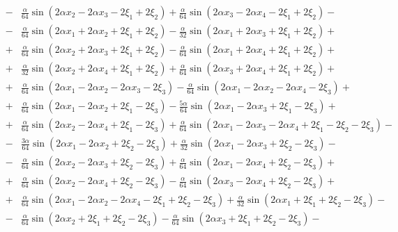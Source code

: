 \documentclass[11pt]{jfm}
\numberwithin{equation}{section}
\begin{document}
\begin{eqnarray}
&\!-\!& \frac{\alpha}{64} \sin(2\alpha x_2 \!-\! 2\alpha x_3 \!-\! 2\xi_1 \!+\! 2\xi_2)\!+\! \frac{\alpha}{64} \sin(2\alpha x_3 \!-\! 2\alpha x_4 \!-\! 2\xi_1 \!+\! 2\xi_2)\!-\!\nonumber\\
&\!-\! &\frac{\alpha}{64} \sin(2\alpha x_1 \!+\! 2\alpha x_2 \!+\! 2\xi_1 \!+\! 2\xi_2) \!-\! \frac{\alpha}{32} \sin(2\alpha x_1 \!+\! 2\alpha x_3 \!+\! 2\xi_1 \!+\! 2\xi_2)\!+\!\nonumber\\
&\!+\!&\frac{\alpha}{64} \sin(2\alpha x_2 \!+\! 2\alpha x_3 \!+\! 2\xi_1 \!+\! 2\xi_2)\!-\! \frac{\alpha}{64} \sin(2\alpha x_1 \!+\! 2\alpha x_4 \!+\! 2\xi_1 \!+\! 2\xi_2)\!+\! \nonumber\\
&\!+\!& \frac{\alpha}{32} \sin(2\alpha x_2 \!+\! 2\alpha x_4 \!+\! 2\xi_1 \!+\! 2\xi_2)\!+\! \frac{\alpha}{64} \sin(2\alpha x_3 \!+\! 2\alpha x_4 \!+\! 2\xi_1 \!+\! 2\xi_2)\!+\!\nonumber\\
&\!+\!& \frac{\alpha}{64} \sin(2\alpha x_1 \!-\! 2\alpha x_2 \!-\! 2\alpha x_3 \!-\! 2\xi_3)\!-\! \frac{\alpha}{64} \sin(2\alpha x_1 \!-\! 2\alpha x_2 \!-\! 2\alpha x_4 \!-\! 2\xi_3)\!+\!\nonumber\\
&\!+\! &\frac{\alpha}{64} \sin(2\alpha x_1 \!-\! 2\alpha x_2 \!+\! 2\xi_1 \!-\! 2\xi_3)\!-\! \frac{5\alpha}{64} \sin(2\alpha x_1 \!-\! 2\alpha x_3 \!+\! 2\xi_1 \!-\! 2\xi_3)\!+\! \nonumber\\
&\!+\!& \frac{\alpha}{64} \sin(2\alpha x_2 \!-\! 2\alpha x_4 \!+\! 2\xi_1 \!-\! 2\xi_3)\!+\!\frac{\alpha}{64} \sin(2\alpha x_1 \!-\! 2\alpha x_3 \!-\! 2\alpha x_4 \!+\! 2\xi_1 \!-\! 2\xi_2 \!-\! 2\xi_3)\!-\! \nonumber\\
&\!-\!&\frac{3\alpha}{64} \sin(2\alpha x_1 \!-\! 2\alpha x_2 \!+\! 2\xi_2 \!-\! 2\xi_3) \!+\! \frac{\alpha}{32} \sin(2\alpha x_1 \!-\! 2\alpha x_3 \!+\! 2\xi_2 \!-\! 2\xi_3)\!-\!\nonumber\\
&\!-\! &\frac{\alpha}{64} \sin(2\alpha x_2 \!-\! 2\alpha x_3 \!+\! 2\xi_2 \!-\! 2\xi_3)\!+\! \frac{\alpha}{64} \sin(2\alpha x_1 \!-\! 2\alpha x_4 \!+\! 2\xi_2 \!-\! 2\xi_3)\!+\!\nonumber\\
&\!+\!& \frac{\alpha}{64} \sin(2\alpha x_2 \!-\! 2\alpha x_4 \!+\! 2\xi_2 \!-\! 2\xi_3)\!-\! \frac{\alpha}{64} \sin(2\alpha x_3 \!-\! 2\alpha x_4 \!+\! 2\xi_2 \!-\! 2\xi_3)\!+\!\nonumber\\
&\!+\!&\frac{\alpha}{64} \sin(2\alpha x_1 \!-\! 2\alpha x_2 \!-\! 2\alpha x_4 \!-\! 2\xi_1 \!+\! 2\xi_2 \!-\! 2\xi_3)\!+\! \frac{\alpha}{32} \sin(2\alpha x_1 \!+\! 2\xi_1 \!+\! 2\xi_2 \!-\! 2\xi_3)\!-\!\nonumber\\
&\!-\!&\frac{\alpha}{64} \sin(2\alpha x_2 \!+\! 2\xi_1 \!+\! 2\xi_2 \!-\! 2\xi_3)\!-\! \frac{\alpha}{64} \sin(2\alpha x_3 \!+\! 2\xi_1 \!+\! 2\xi_2 \!-\! 2\xi_3)\!-\! \nonumber\\

\end{eqnarray}
\end{document}
